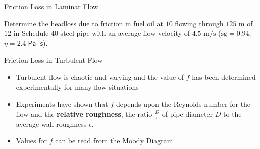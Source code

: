 \documentclass[9pt,xcolor={svgnames, x11names},professionalfonts]{beamer}
\begin{document}
\begin{frame}{Friction Loss in Laminar Flow}
\end{frame}

\begin{frame}
	\begin{cmini}[0.6]{
			\begin{myexam}{}{}
				\raggedright
				Determine the headloss due to friction in fuel oil at $10$\textcelsius{} flowing through $125\text{ m}$
				of $12$-in Schedule $40$ steel pipe with an average flow velocity of $4.5\text{ m/s}$ \lb
				($\text{sg}=0.94$, $\eta=2.4\;\mathsf{Pa\cdot s}$).
				\parm
			\end{myexam}
		}
	\end{cmini}
\end{frame}

\begin{frame}{Friction Loss in Turbulent Flow}
	
	\begin{itemize}
		\item Turbulent flow is chaotic and varying and the value of $f$ has been determined experimentally
		      for many flow situations
		\item Experiments have shown that $f$ depends upon the Reynolds number for the flow and the \textbf{relative roughness},
		      the ratio $\tfrac{D}{\epsilon}$ of pipe diameter $D$ to the average wall roughness $\epsilon$.\par\medskip
		\item Values for $f$ can be read from the Moody Diagram
	\end{itemize}
\end{frame}
\end{document}
